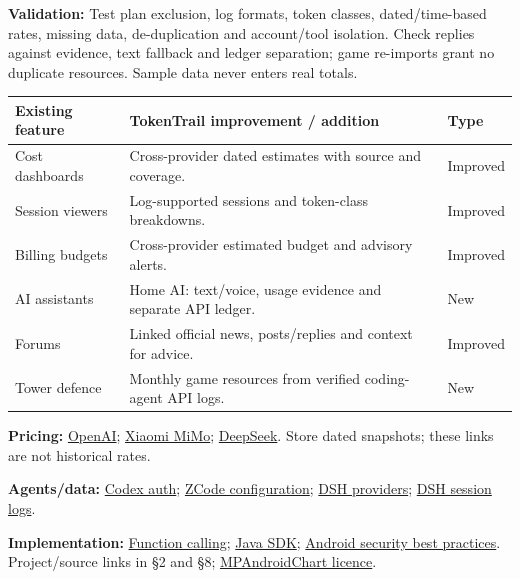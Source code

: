 \documentclass[11pt,a4paper]{article}
\newcommand{\sect}[1]{\vspace{3pt}{\large\bfseries#1}\par\vspace{1pt}}
\begin{document}
\textbf{Validation:} Test plan exclusion, log formats, token classes, dated/time-based rates, missing data, de-duplication and account/tool isolation. Check replies against evidence, text fallback and ledger separation; game re-imports grant no duplicate resources. Sample data never enters real totals.

\sect{11. Functional requirements and improvements}
\begin{tabularx}{\linewidth}{@{}>{\raggedright\arraybackslash}p{31mm}Y p{22mm}@{}}
\toprule
{}
\textbf{Existing feature} & \textbf{TokenTrail improvement / addition} & \textbf{Type} \\
\midrule
Cost dashboards & Cross-provider dated estimates with source and coverage. & Improved \\
Session viewers & Log-supported sessions and token-class breakdowns. & Improved \\
Billing budgets & Cross-provider estimated budget and advisory alerts. & Improved \\
AI assistants & Home AI: text/voice, usage evidence and separate API ledger. & New \\
Forums & Linked official news, posts/replies and context for advice. & Improved \\
Tower defence & Monthly game resources from verified coding-agent API logs. & New \\
\bottomrule
\end{tabularx}

\sect{12. Sources and project references}
\textbf{Pricing:} \href{https://developers.openai.com/api/docs/pricing}{OpenAI}; \href{https://mimo.mi.com/docs/en-US/price/pay-as-you-go}{Xiaomi MiMo}; \href{https://api-docs.deepseek.com/quick_start/pricing/}{DeepSeek}. Store dated snapshots; these links are not historical rates.\par
\textbf{Agents/data:} \href{https://learn.chatgpt.com/docs/auth}{Codex auth}; \href{https://zcode.z.ai/en/docs/configuration}{ZCode configuration}; \href{https://github.com/deepseek-ai/deepseek-harness/blob/master/docs/user/guide/providers.md}{DSH providers}; \href{https://github.com/deepseek-ai/deepseek-harness/blob/master/packages/session/session-persistence-jsonl/README.md}{DSH session logs}.\par
\textbf{Implementation:} \href{https://developers.openai.com/api/docs/guides/function-calling}{Function calling}; \href{https://developers.openai.com/api/docs/libraries}{Java SDK}; \href{https://developer.android.com/privacy-and-security/security-best-practices}{Android security best practices}. Project/source links in \S2 and \S8; \href{https://github.com/PhilJay/MPAndroidChart/blob/master/LICENSE}{MPAndroidChart licence}.
\end{document}
